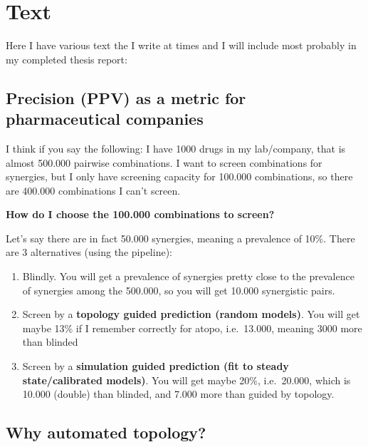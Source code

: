 \documentclass[
  12pt,
]{book}
\providecommand{\tightlist}{%
  \setlength{\itemsep}{0pt}\setlength{\parskip}{0pt}}
\begin{document}
\hypertarget{text}{%
\chapter{Text}\label{text}}

Here I have various text the I write at times and I will include most probably in my completed thesis report:

\hypertarget{precision-ppv-as-a-metric-for-pharmaceutical-companies}{%
\section*{Precision (PPV) as a metric for pharmaceutical companies}\label{precision-ppv-as-a-metric-for-pharmaceutical-companies}}

I think if you say the following: I have 1000 drugs in my lab/company, that is almost 500.000 pairwise combinations.
I want to screen combinations for synergies, but I only have screening capacity for 100.000 combinations, so there are 400.000 combinations I can't screen.

\textbf{How do I choose the 100.000 combinations to screen?}

Let's say there are in fact 50.000 synergies, meaning a prevalence of 10\%.
There are 3 alternatives (using the pipeline):

\begin{enumerate}
\def\labelenumi{\arabic{enumi}.}
\tightlist
\item
  Blindly.
  You will get a prevalence of synergies pretty close to the prevalence of synergies among the 500.000, so you will get 10.000 synergistic pairs.
\item
  Screen by a \textbf{topology guided prediction (random models)}.
  You will get maybe 13\% if I remember correctly for atopo, i.e.~13.000, meaning 3000 more than blinded
\item
  Screen by a \textbf{simulation guided prediction (fit to steady state/calibrated models)}.
  You will get maybe 20\%, i.e.~20.000, which is 10.000 (double) than blinded, and 7.000 more than guided by topology.
\end{enumerate}

\hypertarget{why-automated-topology}{%
\section*{Why automated topology?}\label{why-automated-topology}}
\end{document}
